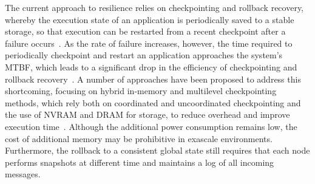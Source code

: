 The current approach to resilience relies on checkpointing and rollback recovery, whereby the execution state of an application is periodically saved to a stable storage, so that execution can be restarted from a recent checkpoint after a failure occurs~\cite{Elnozahy:02:Survey,kalaiselvi_sadhana_2000,Chandy:1985:DSD:214451.214456}. As the rate of failure increases, however, the time required to periodically checkpoint and restart an application approaches the system’s MTBF, which leads to a significant drop in the efficiency of checkpointing and rollback recovery~\cite{Cappello:2009:TER:1640402.1640428}. A number of approaches have been proposed to address this shortcoming, focusing on hybrid in-memory and multilevel checkpointing methods, which rely both on coordinated and uncoordinated checkpointing and the use of NVRAM and DRAM for storage, to reduce overhead and improve execution time~\cite{Gao:2015:RIC:2751205.2751212}. Although the additional power consumption remains low, the cost of additional memory may be prohibitive in exascale environments. Furthermore, the rollback to a consistent global state still requires that each node performs snapshots at different time and maintains a log of all incoming messages. 


